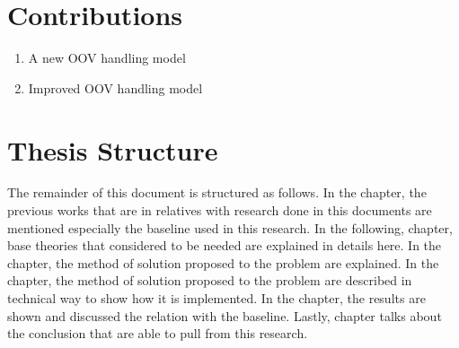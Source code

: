 \section{Contributions}
    \begin{enumerate}
        \item A new OOV handling model
        \item Improved OOV handling model
    \end{enumerate}

\section{Thesis Structure}
    The remainder of this document is structured as follows. In the
     chapter, the previous works that are in
    relatives with research done in this documents are mentioned
    especially the baseline used in this research. In the following,
     chapter, base theories that
    considered to be needed are explained in details here. In the
     chapter, the method of solution proposed to
    the problem are explained. In the 
    chapter, the method of solution proposed to the problem are
    described in technical way to show how it is implemented. In the
     chapter, the results are shown and
    discussed the relation with the baseline. Lastly,
     chapter talks about the conclusion that are
    able to pull from this research.







